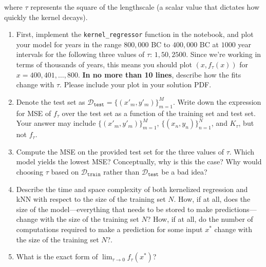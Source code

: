 \documentclass[submit]{harvardml}
\begin{document}
\begin{problem}
\begin{enumerate}
where $\tau$ represents the square of the lengthscale (a scalar value that
dictates how quickly the kernel decays).  


\begin{enumerate}
    
  \item First, implement the \texttt{kernel\_regressor} function in the notebook, and plot your model for years in the range $800,000$ BC to $400,000$ BC at $1000$ year intervals for the following three values of $\tau$: $1, 50, 2500$. Since we're working in terms of thousands of years, this means you should plot $(x, f_\tau(x))$ for $x = 400, 401, \dots, 800$. \textbf{In no more than 10 lines}, describe how the fits change with $\tau$. Please include your plot in your solution PDF.

  \item Denote the test set as $\mathcal{D}_\texttt{test} = \{(x'_m, y'_m)\}_{m = 1} ^M$.  Write down the expression for MSE of $f_\tau$ over the test set as a function of the training set and test set. Your answer may include $\{(x'_m, y'_m)\}_{m = 1} ^M$, $\{(x_n, y_n)\}_{n = 1} ^N$, and $K_\tau$, but not $f_\tau$.

    \item Compute the MSE on the provided test set for the three values of $\tau$.  Which model yields the lowest MSE? Conceptually, why is this the case? Why would choosing $\tau$ based on $\mathcal{D}_\texttt{train}$ rather than $\mathcal{D}_\texttt{test}$ be a bad idea? 

  \item Describe the time and space complexity of both kernelized regression and kNN with respect to the size of the training set $N$.  How, if at all, does the size of the model---everything that needs to be stored to make predictions---change with the size of the training set $N$?  How, if at all, do the number of computations required to make a prediction for some input $x^*$ change with the size of the training set $N$?.
  

  \item  What is the exact form of $\lim_{\tau \to 0 }f_\tau(x^*)$?
  \end{enumerate}
\end{enumerate}
\end{problem}
\end{document}
